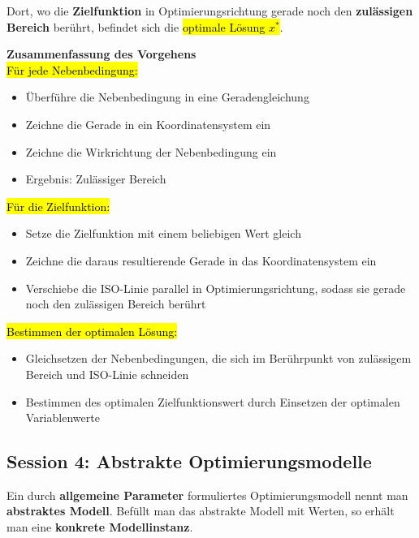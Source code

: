 \documentclass[a4paper, 10pt]{article}
\begin{document}
\noindent \begin{definitionbox}
    Dort, wo die \textbf{Zielfunktion} in
Optimierungsrichtung gerade noch den
\textbf{zulässigen Bereich} berührt, befindet sich
die \hl{optimale Lösung $x^*$}.
\end{definitionbox}
\textbf{Zusammenfassung des Vorgehens}\\[2mm]
\hl{Für jede Nebenbedingung:}
\begin{itemize}
    \item Überführe die Nebenbedingung in eine Geradengleichung
    \item Zeichne die Gerade in ein Koordinatensystem ein
    \item Zeichne die Wirkrichtung der Nebenbedingung ein
    \item Ergebnis: Zulässiger Bereich
\end{itemize}
 \hl{Für die Zielfunktion:}
 \begin{itemize}
     \item Setze die Zielfunktion mit einem beliebigen Wert gleich
     \item Zeichne die daraus resultierende Gerade in das Koordinatensystem ein
     \item Verschiebe die ISO-Linie parallel in Optimierungsrichtung, sodass sie gerade noch den zulässigen Bereich berührt
 \end{itemize}
 \hl{Bestimmen der optimalen Lösung:}
 \begin{itemize}
     \item Gleichsetzen der Nebenbedingungen, die sich im Berührpunkt von zulässigem Bereich und ISO-Linie schneiden
     \item Bestimmen des optimalen Zielfunktionswert durch Einsetzen der optimalen Variablenwerte
 \end{itemize}
 \subsection{Session 4: Abstrakte Optimierungsmodelle}
 \begin{definitionbox}
     Ein durch \textbf{allgemeine Parameter} formuliertes Optimierungsmodell nennt
man \textbf{abstraktes Modell}. Befüllt man das abstrakte Modell mit Werten, so
erhält man eine \textbf{konkrete Modellinstanz}.
 \end{definitionbox}
\end{document}
